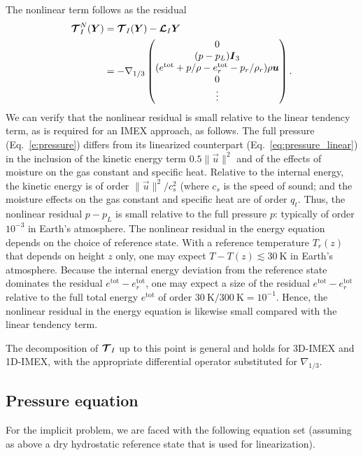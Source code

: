 \documentclass{report}
\numberwithin{equation}{section}
\begin{document}
The nonlinear term follows as the residual 
\begin{equation}\label{e:nonlinear_residual}
\begin{split}
\boldsymbol{{\mathcal{T}}}^N_{I}(\boldsymbol{{Y}}) & =  \boldsymbol{{\mathcal{T}}}_I(\boldsymbol{{Y}}) - \boldsymbol{{\mathcal{L}}}_I \boldsymbol{{Y}} \\
& = 
-\nabla_{1/3} \begin{pmatrix}
0 \\
(p - p_L) \boldsymbol{{I}}_3\\
(e^{\mathrm{tot}}  + p/\rho - e^{\mathrm{tot}}_r - p_r/\rho_r) \rho \boldsymbol{{u}}\\
0\\
\vdots
\end{pmatrix}.
\end{split}
\end{equation}
We can verify that the nonlinear residual is small relative to the linear tendency term, as is required for an IMEX approach, as follows. The full pressure (Eq.~\ref{e:pressure}) differs from its linearized counterpart (Eq.~\ref{eq:pressure_linear}) in the inclusion of the kinetic energy term $0.5 \|\vec{u} \|^2$ and of the effects of moisture on the gas constant and specific heat. Relative to the internal energy, the kinetic energy is of order $\|\vec{u}\|^2/c_s^2$ (where $c_s$ is the speed of sound; 
and the moisture effects on the gas constant and specific heat are of order $q_t$. Thus, the nonlinear residual $p-p_L$ is small relative to the full pressure $p$: typically of order $10^{-3}$ in Earth's atmosphere. The nonlinear residual in the energy equation depends on the choice of reference state. With a reference temperature $T_r(z)$ that depends on height $z$ only, one may expect $T - T(z) \lesssim 30~\mathrm{K}$ in Earth's atmosphere. Because the internal energy deviation from the reference state dominates the residual $e^{\mathrm{tot}} - e^{\mathrm{tot}}_r$, one may expect a size of the residual $e^{\mathrm{tot}} - e^{\mathrm{tot}}_r$ relative to the full total energy $e^{\mathrm{tot}}$ of order $30~\mathrm{K}/300~\mathrm{K} = 10^{-1}$. Hence, the nonlinear residual in the energy equation is likewise small compared with the linear tendency term. 
 
The decomposition of $\boldsymbol{{\mathcal{T}}}_I$ up to this point is general and holds for 3D-IMEX and 1D-IMEX, with the appropriate differential operator substituted for $\nabla_{1/3}$.

\subsection{Pressure equation}
For the implicit problem, we are faced with the following equation set (assuming as above a dry hydrostatic reference state that is used for linearization).
\end{document}
